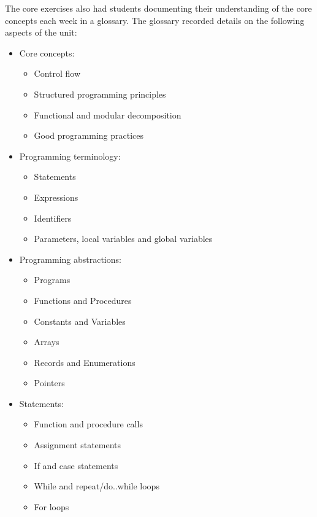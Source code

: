 The core exercises also had students documenting their understanding of the core concepts each week in a glossary. The glossary recorded details on the following aspects of the unit:
\begin{itemize}[noitemsep, nolistsep]
	\item Core concepts:
	\begin{itemize}[noitemsep, nolistsep]
		\item Control flow
		\item Structured programming principles
		\item Functional and modular decomposition
		\item Good programming practices
	\end{itemize}
	\item Programming terminology:
	\begin{itemize}[noitemsep, nolistsep]
		\item Statements
		\item Expressions
		\item Identifiers
		\item Parameters, local variables and global variables
	\end{itemize}
	\item Programming abstractions:
	\begin{itemize}[noitemsep, nolistsep]
		\item Programs
		\item Functions and Procedures
		\item Constants and Variables
		\item Arrays
		\item Records and Enumerations
		\item Pointers
	\end{itemize}
	\item Statements:
	\begin{itemize}[noitemsep, nolistsep]
		\item Function and procedure calls
		\item Assignment statements
		\item If and case statements
		\item While and repeat/do..while loops
		\item For loops
	\end{itemize}
\end{itemize}

